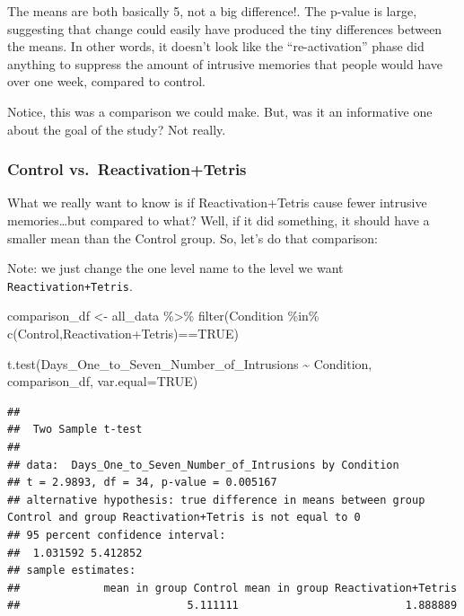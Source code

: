 \documentclass[
]{book}
\newenvironment{Shaded}{\begin{snugshade}}{\end{snugshade}}
\newcommand{\AttributeTok}[1]{\textcolor[rgb]{0.77,0.63,0.00}{#1}}
\newcommand{\ConstantTok}[1]{\textcolor[rgb]{0.00,0.00,0.00}{#1}}
\newcommand{\FunctionTok}[1]{\textcolor[rgb]{0.00,0.00,0.00}{#1}}
\newcommand{\NormalTok}[1]{#1}
\newcommand{\OtherTok}[1]{\textcolor[rgb]{0.56,0.35,0.01}{#1}}
\newcommand{\SpecialCharTok}[1]{\textcolor[rgb]{0.00,0.00,0.00}{#1}}
\newcommand{\StringTok}[1]{\textcolor[rgb]{0.31,0.60,0.02}{#1}}
\begin{document}
The means are both basically 5, not a big difference!. The p-value is large, suggesting that change could easily have produced the tiny differences between the means. In other words, it doesn't look like the ``re-activation'' phase did anything to suppress the amount of intrusive memories that people would have over one week, compared to control.

Notice, this was a comparison we could make. But, was it an informative one about the goal of the study? Not really.

\hypertarget{control-vs.-reactivationtetris}{%
\subsubsection{Control vs.~Reactivation+Tetris}\label{control-vs.-reactivationtetris}}

What we really want to know is if Reactivation+Tetris cause fewer intrusive memories\ldots but compared to what? Well, if it did something, it should have a smaller mean than the Control group. So, let's do that comparison:

Note: we just change the one level name to the level we want \texttt{Reactivation+Tetris}.

\begin{Shaded}
\begin{Highlighting}[]
\NormalTok{comparison\_df }\OtherTok{\textless{}{-}}\NormalTok{ all\_data }\SpecialCharTok{\%\textgreater{}\%} 
                  \FunctionTok{filter}\NormalTok{(Condition }\SpecialCharTok{\%in\%} \FunctionTok{c}\NormalTok{(}\StringTok{\textquotesingle{}Control\textquotesingle{}}\NormalTok{,}\StringTok{\textquotesingle{}Reactivation+Tetris\textquotesingle{}}\NormalTok{)}\SpecialCharTok{==}\ConstantTok{TRUE}\NormalTok{)}
                        
\FunctionTok{t.test}\NormalTok{(Days\_One\_to\_Seven\_Number\_of\_Intrusions }\SpecialCharTok{\textasciitilde{}}\NormalTok{ Condition, }
\NormalTok{       comparison\_df,}
       \AttributeTok{var.equal=}\ConstantTok{TRUE}\NormalTok{)}
\end{Highlighting}
\end{Shaded}

\begin{verbatim}
## 
##  Two Sample t-test
## 
## data:  Days_One_to_Seven_Number_of_Intrusions by Condition
## t = 2.9893, df = 34, p-value = 0.005167
## alternative hypothesis: true difference in means between group Control and group Reactivation+Tetris is not equal to 0
## 95 percent confidence interval:
##  1.031592 5.412852
## sample estimates:
##             mean in group Control mean in group Reactivation+Tetris 
##                          5.111111                          1.888889
\end{verbatim}
\end{document}
